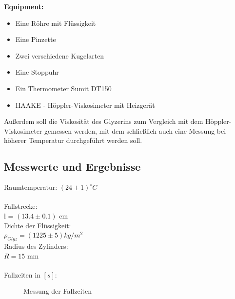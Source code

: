 \documentclass[12pt,a4paper]{article}
\begin{document}
\begin{multicols}{2}
\textbf{Equipment:}\\
\begin{itemize}
	\item Eine Röhre mit Flüssigkeit
	\item Eine Pinzette
	\item Zwei verschiedene Kugelarten
	\item Eine Stoppuhr
	\item Ein Thermometer Sumit DT150
	\item HAAKE - Höppler-Viskosimeter mit Heizgerät
\end{itemize}
Außerdem soll die Viskosität des Glyzerins zum Vergleich mit dem Höppler-Viskosimeter gemessen werden, mit dem schließlich auch eine Messung bei höherer Temperatur durchgeführt werden soll.



\subsection{Messwerte und Ergebnisse}
Raumtemperatur: $(24 \pm 1)^{\circ}C$\\
\\
Fallstrecke: \\
\indent l = $(13.4 \pm 0.1)$ cm\\
\noindent Dichte der Flüssigkeit: \\
\indent $\rho_{Glyz} = (1225 \pm 5) kg/m^2$\\
Radius des Zylinders:\\
\indent$R=15$ mm\\
\\
Fallzeiten in $[s]$:
\begin{figure}[H]
	\centering
	\caption{Messung der Fallzeiten}
	\label{fig:visko_fallzeit}
\end{figure}
\noindent


\end{multicols}
\end{document}

